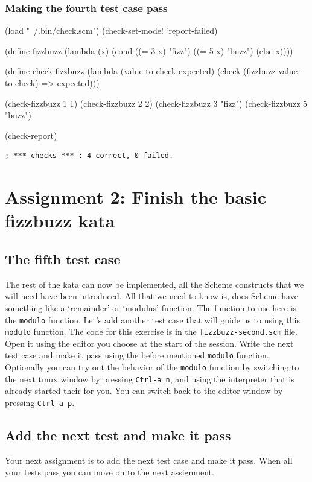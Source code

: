 \documentclass[12pt,a4paper,english,twoside]{article}
\begin{document}
\subsubsection{Making the fourth test case pass}
\begin{schemecode}
(load "~/.bin/check.scm")
(check-set-mode! 'report-failed)

(define fizzbuzz 
  (lambda (x) 
    (cond ((= 3 x) "fizz")
          ((= 5 x) "buzz")
          (else x))))

(define check-fizzbuzz 
  (lambda (value-to-check expected)
    (check (fizzbuzz value-to-check) => expected)))

(check-fizzbuzz 1 1)
(check-fizzbuzz 2 2)
(check-fizzbuzz 3 "fizz")
(check-fizzbuzz 5 "buzz")

(check-report)
\end{schemecode}
\begin{lstlisting}
; *** checks *** : 4 correct, 0 failed.  
\end{lstlisting}
\section{Assignment 2: Finish the basic fizzbuzz kata}
\subsection{The fifth test case}
The rest of the kata can now be implemented, all the Scheme constructs that we 
will need have been introduced. All that we need to know is, does Scheme have 
something like a `remainder' or `modulus' function. The function to use here 
is the \texttt{modulo} function. Let's add another test case that will guide 
us to using this \texttt{modulo} function. The code for this exercise is in 
the \texttt{fizzbuzz-second.scm} file. Open it using the editor you choose at 
the start of the session. Write the next test case and make it pass using the 
before mentioned \texttt{modulo} function. Optionally you can try out the 
behavior of the \texttt{modulo} function by switching to the next tmux window 
by pressing \texttt{Ctrl-a n}, and using the interpreter that is already 
started their for you. You can switch back to the editor window by pressing 
\texttt{Ctrl-a p}.
\subsection{Add the next test and make it pass}
Your next assignment is to add the next test case and make it pass. When all 
your tests pass you can move on to the next assignment.
\end{document}
